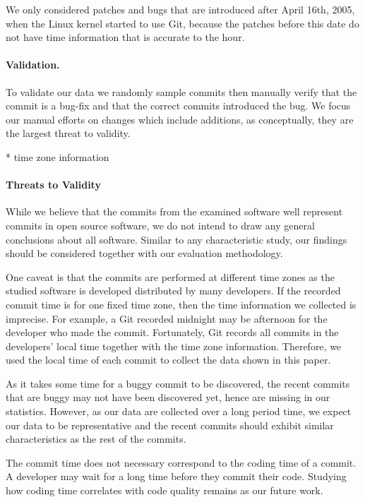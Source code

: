 We only considered patches and bugs that are introduced after April 16th, 2005, when
the Linux kernel started to use Git, because the patches before this date do not have 
time information that is accurate to the hour.

\paragraph{Validation.}
To validate our data we randomly sample commits then manually verify
that the commit is a bug-fix and that the correct commits introduced
the bug. We focus our manual efforts on changes which include
additions, as conceptually, they are the largest threat to validity.


* time zone information



\paragraph{Threats to Validity}
While we believe that the commits from the examined software well represent commits in 
open source software, we do not intend to draw any general conclusions about
all software. 
Similar to any characteristic study, our
findings should be considered together with our evaluation methodology.

One caveat is that the commits are performed at different time zones as the studied software is 
developed distributed by many developers. If the recorded commit time is for one fixed time zone,
then the time information we collected is imprecise. For example, a Git recorded midnight may be afternoon
for the developer who made the commit. Fortunately, Git records all commits in the developers' local time 
together with the time zone information. Therefore, we used the local time of each commit to collect 
the data shown in this paper. 

As it takes some time for a buggy commit to be discovered, the recent commits that are buggy may not 
have been discovered yet, hence are missing in our statistics. However, as our data are collected over a long period time, 
we expect our data to be representative and the recent commits should exhibit similar characteristics as the rest of the commits. 

The commit time does not necessary correspond to the coding time of a commit. A developer may wait 
for a long time before they commit their code. Studying how coding time correlates with code quality remains as our future work. 
